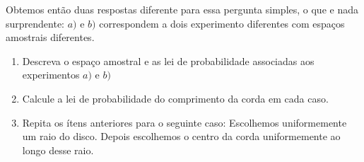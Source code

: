 \documentclass[../main/Notas_de_aula.tex]{subfiles}
\begin{document}
\begin{topics}
\medskip

Obtemos então duas respostas diferente para essa pergunta simples, o que e nada surprendente: $a)$ e $b)$ correspondem a dois experimento
diferentes com espaços amostrais diferentes.


\begin{exercise}
\begin{enumerate}[\quad a)]
 \item Descreva o espaço amostral e as lei de probabilidade associadas aos experimentos $a)$ e $b)$
 \item Calcule a lei de probabilidade do comprimento da corda em cada caso.
 \item Repita os ítens anteriores para o seguinte caso: Escolhemos uniformemente um raio do disco.
Depois escolhemos o centro da corda uniformemente ao longo desse raio.
\end{enumerate}

\end{exercise}

\end{topics}
\end{document}
